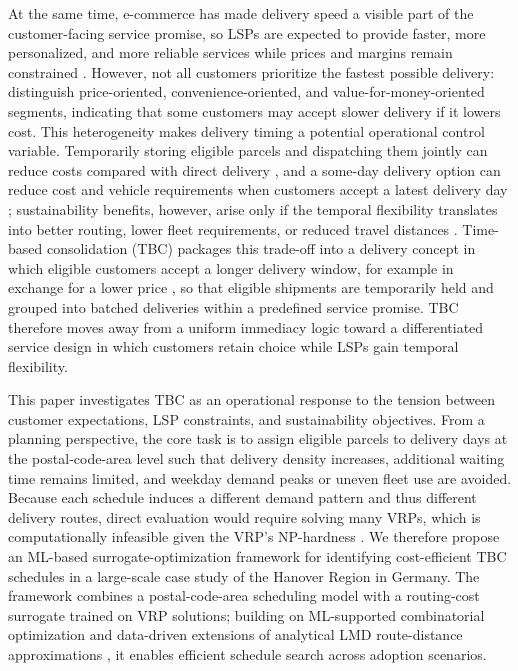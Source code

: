\documentclass[3p,times,procedia]{elsarticle}
\begin{document}
At the same time, e-commerce has made delivery speed a visible part of the customer-facing service promise, so LSPs are expected to provide faster, more personalized, and more reliable services while prices and margins remain constrained \citep{Vivaldini}. However, not all customers prioritize the fastest possible delivery: \citet{Nguyen19} distinguish price-oriented, convenience-oriented, and value-for-money-oriented segments, indicating that some customers may accept slower delivery if it lowers cost. This heterogeneity makes delivery timing a potential operational control variable. Temporarily storing eligible parcels and dispatching them jointly can reduce costs compared with direct delivery \citep{PENG2023109044}, and a some-day delivery option can reduce cost and vehicle requirements when customers accept a latest delivery day \citep{Voigt2025SomeDayDelivery}; sustainability benefits, however, arise only if the temporal flexibility translates into better routing, lower fleet requirements, or reduced travel distances \citep{Zeelenberg2026WillingnessToWait}. Time-based consolidation (TBC) packages this trade-off into a delivery concept in which eligible customers accept a longer delivery window, for example in exchange for a lower price \citep{Naeimian2026TemporalConsolidation}, so that eligible shipments are temporarily held and grouped into batched deliveries within a predefined service promise. TBC therefore moves away from a uniform immediacy logic toward a differentiated service design in which customers retain choice while LSPs gain temporal flexibility.

This paper investigates TBC as an operational response to the tension between customer expectations, LSP constraints, and sustainability objectives. From a planning perspective, the core task is to assign eligible parcels to delivery days at the postal-code-area level such that delivery density increases, additional waiting time remains limited, and weekday demand peaks or uneven fleet use are avoided. Because each schedule induces a different demand pattern and thus different delivery routes, direct evaluation would require solving many VRPs, which is computationally infeasible given the VRP's NP-hardness \citep{LenstraRinnooyKan1981}. We therefore propose an ML-based surrogate-optimization framework for identifying cost-efficient TBC schedules in a large-scale case study of the Hanover Region in Germany. The framework combines a postal-code-area scheduling model with a routing-cost surrogate trained on VRP solutions; building on ML-supported combinatorial optimization \citep{BENGIO2021405} and data-driven extensions of analytical LMD route-distance approximations \citep{Figliozzi08, KIRUBAKARAN2026101720}, it enables efficient schedule search across adoption scenarios.
\end{document}
